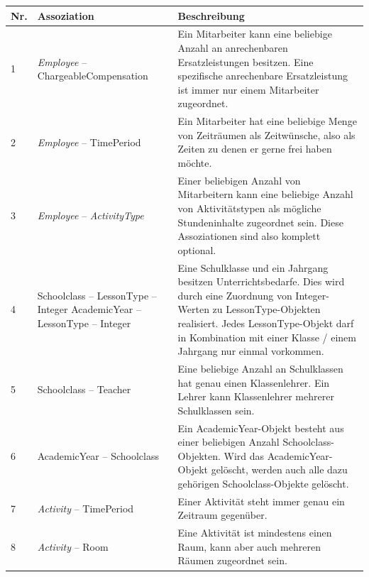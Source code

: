 \documentclass[fontsize=12pt,paper=a4,twoside]{scrartcl}
\begin{document}
\begin{tabularx}{\textwidth}{|p{0.6cm}|p{5cm}|X|}
\hline
\textbf{Nr.} & \textbf{Assoziation} & \textbf{Beschreibung} \\\hline
1 	& \textit{Employee} -- ChargeableCompensation	& Ein Mitarbeiter kann eine beliebige Anzahl
	an anrechenbaren Ersatzleistungen besitzen. Eine spezifische anrechenbare Ersatzleistung ist immer nur einem Mitarbeiter zugeordnet. \\\hline
2	& \textit{Employee} -- TimePeriod		& Ein Mitarbeiter hat eine beliebige Menge von 
	Zeiträumen als Zeitwünsche, also als Zeiten zu denen er gerne frei haben möchte. \\\hline
3	& \textit{Employee} -- \textit{ActivityType} & Einer beliebigen Anzahl von Mitarbeitern kann
	eine beliebige Anzahl von Aktivitätstypen als mögliche Stundeninhalte zugeordnet sein. Diese Assoziationen sind also komplett optional. \\\hline
4	& Schoolclass -- LessonType -- Integer \newline
	  AcademicYear -- LessonType -- Integer				& Eine Schulklasse und ein Jahrgang besitzen Unterrichtsbedarfe. Dies wird durch eine Zuordnung von Integer-Werten zu LessonType-Objekten realisiert. Jedes LessonType-Objekt darf in Kombination mit einer Klasse / einem Jahrgang nur einmal vorkommen. \\\hline
5	& Schoolclass -- Teacher 				& Eine beliebige Anzahl an Schulklassen hat genau
	einen Klassenlehrer. Ein Lehrer kann Klassenlehrer mehrerer Schulklassen sein. \\\hline
6	& AcademicYear -- Schoolclass 			& Ein AcademicYear-Objekt besteht aus einer beliebigen 
	Anzahl Schoolclass-Objekten. Wird das AcademicYear-Objekt gelöscht, werden auch alle dazu gehörigen Schoolclass-Objekte gelöscht.\\\hline
7	& \textit{Activity} -- TimePeriod				& Einer Aktivität steht immer genau ein
	Zeitraum gegenüber.\\\hline
8	& \textit{Activity} -- Room						& Eine Aktivität ist mindestens einen Raum, 
	kann aber auch mehreren Räumen zugeordnet sein.\\\hline
\end{tabularx}
\end{document}
